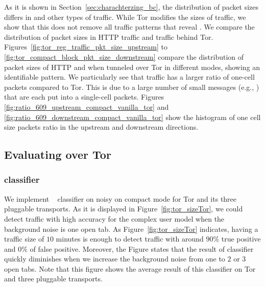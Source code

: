 As it is shown in Section~\ref{sec:charachterzing_bc}, the distribution of packet sizes differs in \bc and other types of traffic. While Tor modifies the sizes of \bc traffic, we show that this does not remove all traffic patterns that reveal \bc. We compare the distribution of packet sizes in HTTP traffic and \bc traffic behind Tor. 
Figures~\ref{fig:tor_reg_traffic_pkt_size_upstream} to \ref{fig:tor_compact_block_pkt_size_downstream} 
 compare the distribution of packet sizes of HTTP and \bc when tunneled over Tor in different modes, showing an identifiable pattern.
We particularly see that \bc traffic has a larger ratio of one-cell packets compared to Tor. This is due to a large number of small \bc messages (e.g., ) that are each put into a single-cell packets. Figures \ref{fig:ratio_609_upstream_compact_vanilla_tor} and \ref{fig:ratio_609_downstream_compact_vanilla_tor} show the histogram of one cell size packets ratio in the upstream and downstream directions. 
\subsection{Evaluating \bc over Tor}
\subsubsection{ classifier}
We implement ~ classifier on noisy \bc on compact mode for Tor and its three pluggable transports. As it is displayed in Figure~\ref{fig:tor_sizeTor}, we could detect \bc traffic with high accuracy for the complex user model when the background noise is one open tab. As Figure~\ref{fig:tor_sizeTor} indicates, having a traffic size of $10$ minutes is
enough to detect \bc traffic with around $90\%$ true positive and $0\%$ of false positive. Moreover, the Figure states that the result of classifier quickly diminishes when we increase the background noise from one to $2$ or $3$ open tabs.
Note that this figure shows the average result of this classifier on Tor and three pluggable transports.
